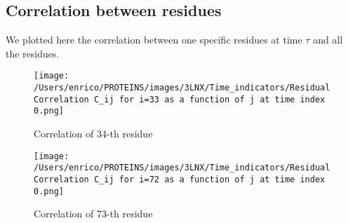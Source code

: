 \documentclass[English, Lau, oneside]{sapthesis}
\begin{document}
\subsection{Correlation between residues}
\noindent We plotted here the correlation between one specific residues at time \(\tau\) and all the residues.\\
\begin{figure}[h!]
    \centering
    \texttt{[image: /Users/enrico/PROTEINS/images/3LNX/Time\_indicators/Residual Correlation C\_ij for i=33 as a function of j at time index 0.png]}
    \caption{Correlation of 34-th residue}
    \label{fig:Correlation of 34-th residue}
\end{figure}
\begin{figure}[h!]
    \centering
    \texttt{[image: /Users/enrico/PROTEINS/images/3LNX/Time\_indicators/Residual Correlation C\_ij for i=72 as a function of j at time index 0.png]}
    \caption{Correlation of 73-th residue}
    \label{fig:Correlation of 73-th residue}
\end{figure}
\end{document}
